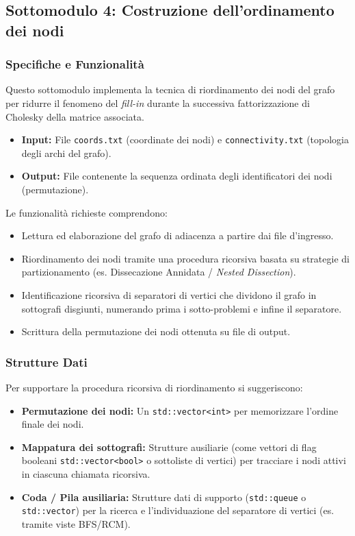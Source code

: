 \documentclass[twocolumn]{article}
\begin{document}
\subsection{Sottomodulo 4: Costruzione dell'ordinamento dei nodi}

\subsubsection{Specifiche e Funzionalit\`a}
Questo sottomodulo implementa la tecnica di riordinamento dei nodi del grafo per ridurre il fenomeno del \textit{fill-in} durante la successiva fattorizzazione di Cholesky della matrice associata.
\begin{itemize}
    \item \textbf{Input:} File \texttt{coords.txt} (coordinate dei nodi) e \texttt{connectivity.txt} (topologia degli archi del grafo).
    \item \textbf{Output:} File contenente la sequenza ordinata degli identificatori dei nodi (permutazione).
\end{itemize}

Le funzionalit\`a richieste comprendono:
\begin{itemize}
    \item Lettura ed elaborazione del grafo di adiacenza a partire dai file d'ingresso.
    \item Riordinamento dei nodi tramite una procedura ricorsiva basata su strategie di partizionamento (es. Dissecazione Annidata / \textit{Nested Dissection}).
    \item Identificazione ricorsiva di separatori di vertici che dividono il grafo in sottografi disgiunti, numerando prima i sotto-problemi e infine il separatore.
    \item Scrittura della permutazione dei nodi ottenuta su file di output.
\end{itemize}

\subsubsection{Strutture Dati}
Per supportare la procedura ricorsiva di riordinamento si suggeriscono:
\begin{itemize}
    \item \textbf{Permutazione dei nodi:} Un \texttt{std::vector<int>} per memorizzare l'ordine finale dei nodi.
    \item \textbf{Mappatura dei sottografi:} Strutture ausiliarie (come vettori di flag booleani \texttt{std::vector<bool>} o sottoliste di vertici) per tracciare i nodi attivi in ciascuna chiamata ricorsiva.
    \item \textbf{Coda / Pila ausiliaria:} Strutture dati di supporto (\texttt{std::queue} o \texttt{std::vector}) per la ricerca e l'individuazione del separatore di vertici (es. tramite viste BFS/RCM).
\end{itemize}
\end{document}
